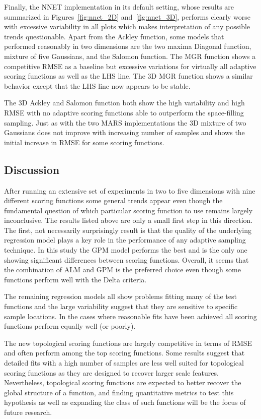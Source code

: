Finally, the NNET implementation in its default setting, whose results are summarized in Figures~\ref{fig:nnet_2D} and~\ref{fig:nnet_3D}, performs clearly worse with excessive variability in all plots which makes interpretation of any possible trends questionable.
%
Apart from the Ackley function, some models that performed reasonably in two dimensions are the two maxima Diagonal function, mixture of five Gaussians, and the Salomon function.
%
The MGR function shows a competitive RMSE as a baseline but excessive variations for virtually all adaptive scoring functions as well as the LHS line.
%
The 3D MGR function shows a similar behavior except that the LHS line now appears to be stable.

The 3D Ackley and Salomon function both show the high variability and high RMSE with no adaptive scoring functions able to outperform the space-filling sampling.
%
Just as with the two MARS implementations the 3D mixture of two Gaussians does not improve with increasing number of samples and shows the initial increase in RMSE for some scoring functions.

\subsection{Discussion}

After running an extensive set of experiments in two to five dimensions with nine different scoring functions some general trends appear even though the fundamental question of which particular scoring function to use remains largely inconclusive.
%
The results listed above are only a small first step in this direction.
%
The first, not necessarily surprisingly result is that the quality of the underlying regression model plays a key role in the performance of any adaptive sampling technique.
%
In this study the GPM model performs the best and is the only one showing significant differences between scoring functions.
%
Overall, it seems that the combination of ALM and GPM is the preferred choice even though some functions perform well with the Delta criteria.

The remaining regression models all show problems fitting many of the test functions and the large variability suggest that they are sensitive to specific sample locations.
%
In the cases where reasonable fits have been achieved all scoring functions perform equally well (or poorly).

The new topological scoring functions are largely competitive in terms of RMSE and often perform among the top scoring functions.
%
Some results suggest that detailed fits with a high number of samples are less well suited for topological scoring functions as they are designed to recover larger scale features.
%
Nevertheless, topological scoring functions are expected to better recover the global structure of a function, and finding quantitative metrics to test this hypothesis as well as expanding the class of such functions will be the focus of future research.

